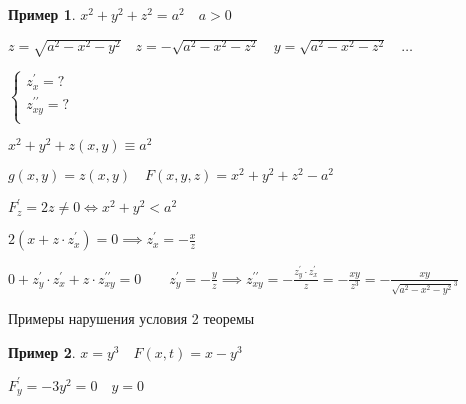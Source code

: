 \documentclass{book}
\newcommand{\p}[1]{#1^{\prime}}
\newcommand{\pp}[1]{#1^{\prime\prime}}
\theoremstyle{definition}
\newtheorem*{example}{Пример}
\begin{document}
\begin{example}
    $x^2+y^2+z^2=a^2\quad a>0$

    $z = \sqrt{a^2-x^2-y^2} \quad z = -\sqrt{a^2-x^2-z^2}\quad y = \sqrt{a^2-x^2-z^2}\quad \ldots  $

    $\begin{cases}
        \p z_x = ?\\
        \pp z_{xy} = ?\\
    \end{cases}$ 

    $x^2+y^2+z(x,y) \equiv a^2$

    $g(x,y) = z(x,y)\quad F(x,y,z) = x^2+y^2+z^2-a^2$

    $\p F_z = 2z\neq 0 \iff x^2+y^2<a^2$

    $2\left( x+z\cdot \p z_x \right)  = 0 \implies \p z_x = -\frac{x}{z}$ 

    $0+\p z_y \cdot \p z_x + z\cdot \pp z_{xy} = 0\qquad \p z_y = -\frac{y}{z} \implies \pp z_{xy} = -\frac{\p z_y \cdot  \p z_x}{z} = -\frac{xy}{z^3} = -\frac{xy}{\sqrt{a^2-x^2-y^2}^3 }$
\end{example}
Примеры нарушения условия 2 теоремы
\begin{example}
    $x = y^3\quad F(x,t) = x-y^3$

    $\p F_y = -3y^2 = 0\quad y=0$
\end{example}
\end{document}
